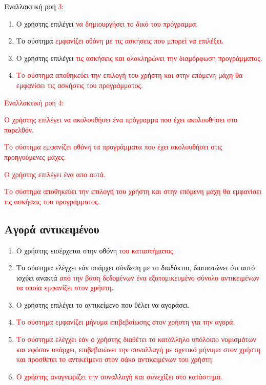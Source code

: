 Εναλλακτική ροή \textcolor{red}{3}:
\begin{enumerate}[label=5.\alph*.,ref=5.\alph*]
    \item Ο χρήστης επιλέγει \textcolor{red}{να δημιουργήσει το δικό του πρόγραμμα.}
    \item Το σύστημα \textcolor{red}{εμφανίζει οθόνη με τις ασκήσεις που μπορεί να επιλέξει.}
    \item Ο χρήστης επιλέγει \textcolor{red}{τις ασκήσεις και ολοκληρώνει την διαμόρφωση προγράμματος.}
    \item \textcolor{red}{Το σύστημα αποθηκεύει την επιλογή του χρήστη και στην επόμενη μάχη θα εμφανίσει τις ασκήσεις του προγράμματος.}
\end{enumerate}
\textcolor{red}{
Εναλλακτική ροή 4:
}
\begin{enumerate}[label=5.\alph*.,ref=5.\alph*]

    \item \textcolor{red}{Ο χρήστης επιλέγει να ακολουθήσει ένα πρόγραμμα που έχει ακολουθήσει στο παρελθόν.
    \item Το σύστημα εμφανίζει οθόνη τα προγράμματα που έχει ακολουθήσει στις προηγούμενες μάχες.
    \item Ο χρήστης επιλέγει ένα απο αυτά.
    \item Το σύστημα αποθηκεύει την επιλογή του χρήστη και στην επόμενη μάχη θα εμφανίσει τις ασκήσεις του προγράμματος.}
\end{enumerate}



\newpage
\subsection{Αγορά αντικειμένου}
\label{sec:buy}
\begin{enumerate}
    \item Ο χρήστης εισέρχεται στην οθόνη \textcolor{red}{του καταστήματος.}
    \item Το σύστημα ελέγχει εάν υπάρχει σύνδεση με το διαδύκτιο, διαπιστώνει ότι αυτό ισχύει ανακτά \textcolor{red}{από την βάση δεδομένων ένα εξατομικευμένο σύνολο αντικειμένων τα οποία εμφανίζει στον χρήστη.}
    \item Ο χρήστης επιλέγει το αντικείμενο που θέλει να αγοράσει.
    \item \textcolor{red}{Το σύστημα εμφανίζει μήνυμα επιβεβαίωσης στον χρήστη για την αγορά.}
    \item \textcolor{red}{Το σύστημα ελέγχει εάν ο χρήστης διαθέτει το κατάλληλο υπόλοιπο νομισμάτων και εφόσον υπάρχει, επιβεβαιώνει την συναλλαγή με σχετικό μήνυμα στον χρήστη και προσθέτει το αντικείμενο στον σάκο αντικειμένων του χρήστη.}
    \item \textcolor{red}{Ο χρήστης αναγνωρίζει την συναλλαγή και συνεχίζει στο κατάστημα.}
\end{enumerate}

